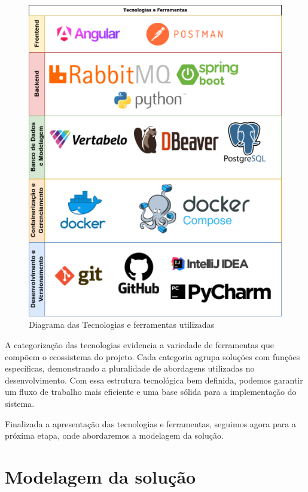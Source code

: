 \documentclass[
	12pt,				%
	oneside,			%
	a4paper,			%
	english,			%
	french,				%
	spanish,			%
	brazil				%
	]{abntex2}
\begin{document}
\begin{figure}[htbp]
\hypertarget{diagrama_tecnologias_ferramentas}{%
\caption{Diagrama das Tecnologias e ferramentas utilizadas}\label{diagrama_tecnologias_ferramentas}
\begin{center}
\includegraphics[scale=0.5]{imagens/sentilytics/diagramas/tecnologias-ferramentas.png}
\end{center}
}
\end{figure}

A categorização das tecnologias evidencia a variedade de ferramentas que
compõem o ecossistema do projeto. Cada categoria agrupa soluções com
funções específicas, demonstrando a pluralidade de abordagens utilizadas
no desenvolvimento. Com essa estrutura tecnológica bem definida, podemos
garantir um fluxo de trabalho mais eficiente e uma base sólida para a
implementação do sistema.

Finalizada a apresentação das tecnologias e ferramentas, seguimos agora
para a próxima etapa, onde abordaremos a modelagem da solução.

\hypertarget{modelagem-da-soluuxe7uxe3o}{%
\section{Modelagem da solução}\label{modelagem-da-soluuxe7uxe3o}}
\end{document}
